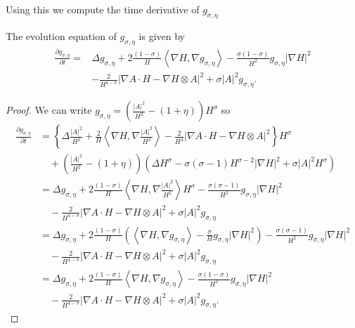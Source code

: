 Using this we compute the time derivative of $ g_{\sigma, \eta} $
\begin{lemma}\label{Deltag}
    The evolution equation of $ g_{\sigma, \eta} $ is given by 
    \begin{align}
        \frac{ \partial g_{\sigma, \eta}}{ \partial t} =& \Delta g_{\sigma, \eta} + 2\frac{(1-\sigma)}{H}\left< \nabla H, \nabla g_{\sigma, \eta} \right> - \frac{\sigma (1-\sigma)}{H^{2}}g_{\sigma, \eta} | \nabla H|^{2} \nonumber\\
    &  - \frac{2}{H^{4-\sigma}}|\nabla A \cdot H - \nabla H \otimes A|^{2} + \sigma |A|^{2} g_{\sigma, \eta}.
    \end{align}
\end{lemma}
\begin{proof}
    We can write $ g_{\sigma, \eta } = \left( \frac{|A|^{2}}{H^{2}}- (1+ \eta) \right)H^{\sigma}  $ so \begin{align*}
        \frac{ \partial g_{\sigma, \eta}}{ \partial t} & = \left\{\Delta \frac{|A|^{2}}{H^{2}}+ \frac{2}{H} \left< \nabla H , \nabla \frac{ |A|^{2}}{H^{2}}\right>  - \frac{2}{H^{4}}|\nabla A \cdot H - \nabla H \otimes A|^{2} \right\}H^{\sigma} \\
        & \quad + \left( \frac{|A|^{2}}{H^{2}}- (1+ \eta) \right) \left( \Delta H^{\sigma} - \sigma(\sigma -1)H^{\sigma -2}|\nabla H|^{2} + \sigma |A|^{2}H^{\sigma } \right) \\
        & = \Delta g_{\sigma, \eta} +2\frac{(1-\sigma)}{H}\left< \nabla H, \nabla \frac{|A|^{2}}{H^{2}} \right>H^{\sigma}-\frac{\sigma(\sigma-1)}{H^{2}}g_{\sigma,\eta}|\nabla H|^{2} \\
        & \quad - \frac{2}{H^{4-\sigma}}|\nabla A \cdot H - \nabla H \otimes A|^{2} + \sigma|A|^{2}g_{\sigma,\eta} \\
        & = \Delta g_{\sigma,\eta} + 2\frac{(1-\sigma)}{H}\left(\left< \nabla H, \nabla g_{\sigma,\eta} \right> - \frac{\sigma}{H} g_{\sigma,\eta}| \nabla H|^{2}\right) - \frac{\sigma(\sigma-1)}{H^{2}}g_{\sigma,\eta}|\nabla H|^{2} \\
        & \quad - \frac{2}{H^{4-\sigma}}|\nabla A \cdot H - \nabla H \otimes A|^{2} + \sigma|A|^{2}g_{\sigma,\eta} \\
        & = \Delta g_{\sigma, \eta} + 2\frac{(1-\sigma)}{H}\left< \nabla H, \nabla g_{\sigma, \eta} \right> - \frac{\sigma (1-\sigma)}{H^{2}}g_{\sigma, \eta} | \nabla H|^{2} \\
        &  \quad - \frac{2}{H^{4-\sigma}}|\nabla A \cdot H - \nabla H \otimes A|^{2} + \sigma |A|^{2} g_{\sigma, \eta}.
    \end{align*}
\end{proof}
